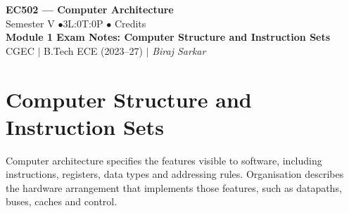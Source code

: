 \documentclass[12pt,a4paper]{article}
\begin{document}

\begin{center}
  {\LARGE\bfseries\color{myred} EC502 --- Computer Architecture}\\[5pt]
  {\normalsize\color{mydark} Semester V \quad$\bullet$\quad 3L:0T:0P \quad$\bullet$ Credits}\\[3pt]
  {\normalsize\color{myteal}\textbf{Module 1 Exam Notes: Computer Structure and Instruction Sets}}\\[3pt]
  {\small\color{mydark} CGEC \;$|$\; B.Tech ECE (2023--27) \;$|$\; \textit{Biraj Sarkar}}
\end{center}
\vspace{2pt}
\noindent{\color{myred}\rule{\linewidth}{1.5pt}}
\vspace{2pt}

\hypersetup{linkcolor=mydark}
\tableofcontents
\hypersetup{linkcolor=myteal}
\newpage

\section{Computer Structure and Instruction Sets}
\begin{tcolorbox}[defbox,title={Architecture and organisation}]
Computer architecture specifies the features visible to software, including instructions, registers, data types and addressing rules. Organisation describes the hardware arrangement that implements those features, such as datapaths, buses, caches and control.
\end{tcolorbox}
\end{document}
